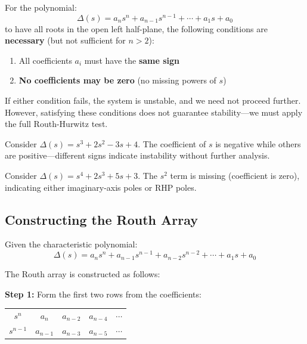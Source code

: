 \begin{theorem}
\label{thm:necessary_conditions}
For the polynomial:
\begin{equation}
\Delta(s) = a_n s^n + a_{n-1} s^{n-1} + \cdots + a_1 s + a_0
\end{equation}
to have all roots in the open left half-plane, the following conditions are \textbf{necessary} (but not sufficient for $n > 2$):
\begin{enumerate}
    \item All coefficients $a_i$ must have the \textbf{same sign}
    \item \textbf{No coefficients may be zero} (no missing powers of $s$)
\end{enumerate}
\end{theorem}

If either condition fails, the system is unstable, and we need not proceed further. However, satisfying these conditions does not guarantee stability---we must apply the full Routh-Hurwitz test.

\begin{example}
Consider $\Delta(s) = s^3 + 2s^2 - 3s + 4$. The coefficient of $s$ is negative while others are positive---different signs indicate instability without further analysis.

Consider $\Delta(s) = s^4 + 2s^3 + 5s + 3$. The $s^2$ term is missing (coefficient is zero), indicating either imaginary-axis poles or RHP poles.
\end{example}

\subsection{Constructing the Routh Array}

Given the characteristic polynomial:
\begin{equation}
\Delta(s) = a_n s^n + a_{n-1} s^{n-1} + a_{n-2} s^{n-2} + \cdots + a_1 s + a_0
\end{equation}

The Routh array is constructed as follows:

\textbf{Step 1:} Form the first two rows from the coefficients:
\begin{center}
\begin{tabular}{c|cccc}
$s^n$ & $a_n$ & $a_{n-2}$ & $a_{n-4}$ & $\cdots$ \\
$s^{n-1}$ & $a_{n-1}$ & $a_{n-3}$ & $a_{n-5}$ & $\cdots$
\end{tabular}
\end{center}

